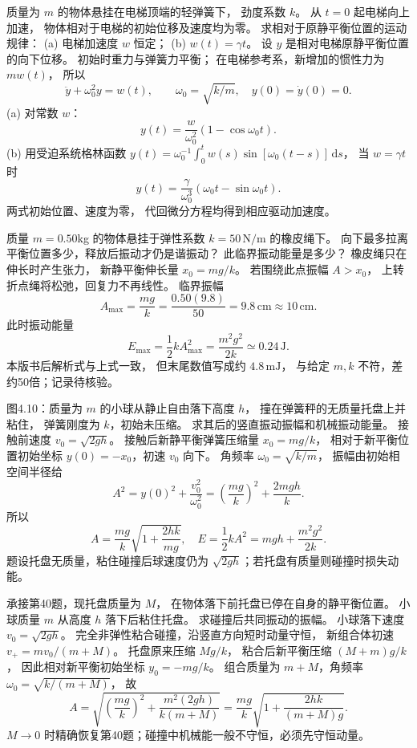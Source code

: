 质量为 $m$ 的物体悬挂在电梯顶端的轻弹簧下，
劲度系数 $k$。
从 $t=0$ 起电梯向上加速，
物体相对于电梯的初始位移及速度均为零。
求相对于原静平衡位置的运动规律：
(a) 电梯加速度 $w$ 恒定；
(b) $w(t)=\gamma t$。
\exsolution
设 $y$ 是相对电梯原静平衡位置的向下位移。
初始时重力与弹簧力平衡；
在电梯参考系，新增加的惯性力为 $mw(t)$，
所以
\[
\ddot y+\omega_0^2y=w(t),
\qquad \omega_0=\sqrt{k/m},
\quad y(0)=\dot y(0)=0.
\]
(a) 对常数 $w$：
\[
\boxed{y(t)=\frac w{\omega_0^2}
(1-\cos\omega_0t)}.
\]
(b) 用受迫系统格林函数
$y(t)=\omega_0^{-1}\int_0^t
w(s)\sin[\omega_0(t-s)]\,\mathrm ds$，
当 $w=\gamma t$ 时
\[
\boxed{y(t)=\frac{\gamma}{\omega_0^3}
(\omega_0t-\sin\omega_0t)}.
\]
\excheck 两式初始位置、速度为零，
代回微分方程均得到相应驱动加速度。

质量 $m=0.50$kg 的物体悬挂于弹性系数
$k=50\,\mathrm{N/m}$ 的橡皮绳下。
向下最多拉离平衡位置多少，释放后振动才仍是谐振动？
此临界振动能量是多少？
\exsolution
橡皮绳只在伸长时产生张力，
新静平衡伸长量
$x_0=mg/k$。
若围绕此点振幅 $A>x_0$，
上转折点绳将松弛，回复力不再线性。
临界振幅
\[
\boxed{A_{\max}=\frac{mg}{k}
=\frac{0.50(9.8)}{50}
=9.8\,\mathrm{cm}\approx10\,\mathrm{cm}}.
\]
此时振动能量
\[
\boxed{E_{\max}=\frac12kA_{\max}^2
=\frac{m^2g^2}{2k}\simeq0.24\,\mathrm J}.
\]
\excheck 本版书后解析式与上式一致，
但末尾数值写成约 $4.8\,\mathrm{mJ}$，
与给定 $m,k$ 不符，差约50倍；记录待核验。

图4.10：质量为 $m$ 的小球从静止自由落下高度 $h$，
撞在弹簧秤的无质量托盘上并粘住，
弹簧刚度为 $k$，初始未压缩。
求其后的竖直振动振幅和机械振动能量。
\exsolution
接触前速度
$v_0=\sqrt{2gh}$。
接触后新静平衡弹簧压缩量
$x_0=mg/k$，
相对于新平衡位置初始坐标
$y(0)=-x_0$，初速 $v_0$ 向下。
角频率 $\omega_0=\sqrt{k/m}$，
振幅由初始相空间半径给
\[
A^2=y(0)^2+\frac{v_0^2}{\omega_0^2}
=\left(\frac{mg}{k}\right)^2+\frac{2mgh}{k}.
\]
所以
\[
\boxed{A=\frac{mg}{k}
\sqrt{1+\frac{2hk}{mg}}},
\quad
\boxed{E=\frac12kA^2
=mgh+\frac{m^2g^2}{2k}}.
\]
\excheck 题设托盘无质量，粘住碰撞后球速度仍为
$\sqrt{2gh}$；若托盘有质量则碰撞时损失动能。

承接第40题，现托盘质量为 $M$，
在物体落下前托盘已停在自身的静平衡位置。
小球质量 $m$ 从高度 $h$ 落下后粘住托盘。
求碰撞后共同振动的振幅。
\exsolution
小球落下速度 $v_0=\sqrt{2gh}$。
完全非弹性粘合碰撞，沿竖直方向短时动量守恒，
新组合体初速
$v_+=m v_0/(m+M)$。
托盘原来压缩 $Mg/k$，
粘合后新平衡压缩
$(M+m)g/k$，
因此相对新平衡初始坐标
$y_0=-mg/k$。
组合质量为 $m+M$，角频率
$\omega_0=\sqrt{k/(m+M)}$，
故
\[
\boxed{A=
\sqrt{\left(\frac{mg}{k}\right)^2+
\frac{m^2(2gh)}{k(m+M)}}
=\frac{mg}{k}
\sqrt{1+\frac{2hk}{(m+M)g}}}.
\]
\excheck $M\to0$ 时精确恢复第40题；碰撞中机械能一般不守恒，必须先守恒动量。

